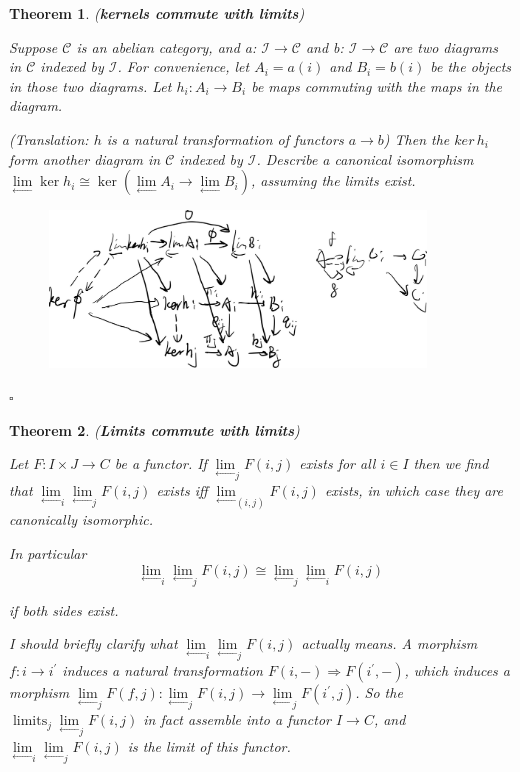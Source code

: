 \documentclass{article}
\newtheorem{theorem}{Theorem}[section]
\newenvironment{Proof}{{\noindent \indent \it Proof:\quad}}{\hfill $\square$\par}
\begin{document}
\begin{theorem}
(\textbf{kernels commute with limits})

Suppose $\mathscr{C}$ is an abelian category, and a: $\mathscr{I} \rightarrow \mathscr{C}$ and b: $\mathscr{I} \rightarrow \mathscr{C}$ are two diagrams in $\mathscr{C}$ indexed by $\mathscr{I}$. For convenience, let $A_{i}=a(i)$ and $B_{i}=b(i)$ be the objects in those two diagrams. Let $h_{i}: A_{i} \rightarrow B_{i}$ be maps commuting with the maps in the diagram. 

(Translation:
$h$ is a natural transformation of functors $a \rightarrow b$) Then the $ker\, h_i$
form another diagram in $\mathscr{C}$ indexed by $\mathscr{I}$. Describe a canonical isomorphism
 $\lim \limits_{\longleftarrow} \operatorname{ker} h_{i} \cong \operatorname{ker}\left(\lim \limits_{\longleftarrow}A_{i} \rightarrow \lim \limits_{\longleftarrow} B_{i}\right)$, assuming the limits exist.
\end{theorem}
\begin{Proof}
    \begin{figure}[htp]
    \centering
    \includegraphics[width=10cm]{3.png}
    \label{fig:3}
\end{figure}

\end{Proof}
\begin{theorem}
(\textbf{Limits commute with limits})

Let $F: I \times J \rightarrow C$ be a functor. If ${\lim \limits_{\longleftarrow}} _j F(i, j)$ exists for all $i \in I$ then we find that ${\lim \limits_{\longleftarrow}} _i {\lim \limits_{\longleftarrow}} _j F(i, j)$ exists iff ${\lim \limits_{\longleftarrow}} _{(i, j)} F(i, j)$ exists, in which case they are canonically isomorphic.

In particular
$$
{\lim \limits_{\longleftarrow}} _i {\lim \limits_{\longleftarrow}} _j F(i, j) \cong {\lim \limits_{\longleftarrow}} _j {\lim \limits_{\longleftarrow}} _i F(i, j)
$$

if both sides exist.

I should briefly clarify what ${\lim \limits_{\longleftarrow}} _i {\lim \limits_{\longleftarrow}} _j F(i, j)$ actually means. A morphism $f: i \rightarrow i^{\prime}$ induces a natural transformation $F(i,-) \Rightarrow F\left(i^{\prime},-\right)$, which induces a morphism ${\lim \limits_{\longleftarrow}} _j F(f, j): {\lim \limits_{\longleftarrow}} _j F(i, j) \rightarrow {\lim \limits_{\longleftarrow}} _j F\left(i^{\prime}, j\right)$. So the $\operatorname{limits}_j {\lim \limits_{\longleftarrow}} _j F(i, j)$ in fact assemble into a functor $I \rightarrow C$, and ${\lim \limits_{\longleftarrow}} _i {\lim \limits_{\longleftarrow}} _j F(i, j)$ is the limit of this functor.
\end{theorem}
\end{document}
